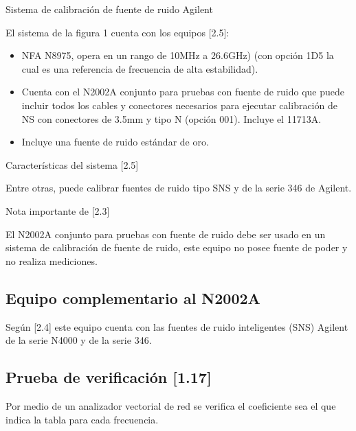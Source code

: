 \documentclass[paper=letter,oneside,fontsize=10pt,parskip=full]{article}
\begin{document}
Sistema de calibración de fuente de ruido Agilent


\bigskip

El sistema de la figura 1 cuenta con los equipos [2.5]:

\begin{itemize}
\item NFA N8975, opera en un rango de 10MHz a 26.6GHz) (con opción 1D5 la cual es una referencia de frecuencia de alta
estabilidad). 
\item Cuenta con el N2002A conjunto para pruebas con fuente de ruido que puede incluir todos los cables y conectores
necesarios para ejecutar calibración de NS con conectores de 3.5mm y tipo N (opción 001). Incluye el 11713A. 
\item Incluye una fuente de ruido estándar de oro.
\end{itemize}
Características del sistema [2.5]

Entre otras, puede calibrar fuentes de ruido tipo SNS y de la serie 346 de Agilent.

Nota importante de [2.3]

El N2002A conjunto para pruebas con fuente de ruido debe ser usado en un sistema de calibración de fuente de ruido, este
equipo no posee fuente de poder y no realiza mediciones.

\subsection{}

\bigskip

\subsection{Equipo complementario al N2002A}
Según [2.4] este equipo cuenta con las fuentes de ruido inteligentes (SNS) Agilent de la serie N4000 y de la serie 346.


\bigskip


\bigskip


\bigskip

\subsection{Prueba de verificación [1.17]}
Por medio de un analizador vectorial de red se verifica el coeficiente sea el que indica la tabla para cada frecuencia.
\end{document}

